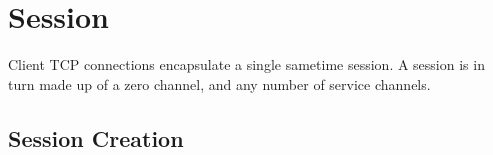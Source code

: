 

\chapter{Session}

\par{} Client TCP connections encapsulate a single sametime session. A
session is in turn made up of a zero channel, and any number of
service channels.


\section{Session Creation}

